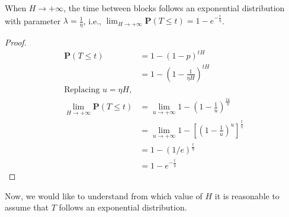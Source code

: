 \begin{theorem}
	When $H \rightarrow +\infty$, the time between blocks follows an exponential distribution with parameter $\lambda = \frac{1}{\eta}$, i.e., $\lim_{H \rightarrow +\infty} \mathbf{P}(T \leq t) = 1 - e^{-\frac{t}{\eta}}$.
\end{theorem}
\begin{proof}
\begin{align*}
	\mathbf{P}(T \leq t) &= 1 - (1-p)^{tH} \\
		     &= 1 - \left( 1 - \frac{1}{\eta H} \right)^{tH} \\
	\text{Replacing $u = \eta H$,} \\
	\lim_{H \rightarrow +\infty} \mathbf{P}(T \leq t) &= \lim_{u \rightarrow +\infty} 1 - \left( 1 - \frac{1}{u} \right)^{\frac{tu}{\eta}} \\
				&= \lim_{u \rightarrow +\infty} 1 - \left[ \left( 1 - \frac{1}{u} \right)^{u} \right]^{\frac{t}{\eta}} \\
				&= 1 - \left( 1/e \right)^{\frac{t}{\eta}} \\
				&= 1 - e^{-\frac{t}{\eta}}
\end{align*}
\end{proof}

Now, we would like to understand from which value of $H$ it is reasonable to assume that $T$ follows an exponential distribution.

